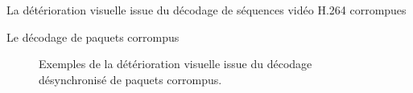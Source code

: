 \documentclass[letterpaper, twoside, 12pt,memoire]{thETS}
\begin{document}
\begin{chapter}{La détérioration visuelle issue du décodage de séquences vidéo
H.264 corrompues}
\begin{section}{Le décodage de paquets corrompus}
\begin{figure}[htb]
\caption{Exemples de la détérioration visuelle issue du décodage désynchronisé
de paquets corrompus.}
\label{fig-badImages}
\end{figure}


\end{section}
\end{chapter}
\end{document}
